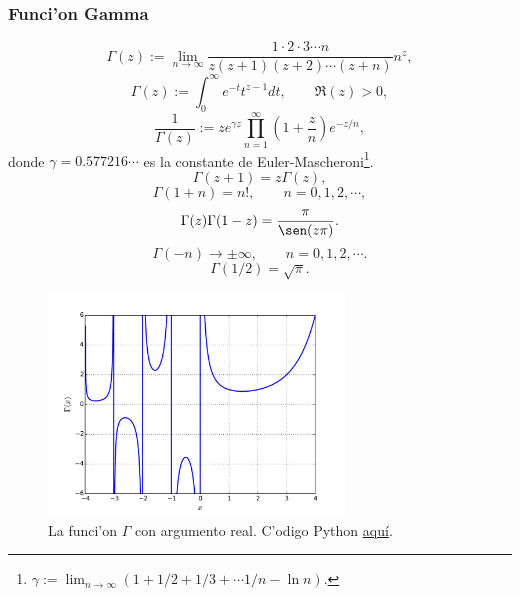 \subsubsection{Funci'on Gamma}
\begin{equation}
\Gamma(z):=\lim_{n\to\infty}\frac{1\cdot 2\cdot 3\cdots n}{z(z+1)(z+2)\cdots (z+n)}n^z,
\end{equation}
\begin{equation}
\Gamma(z):=\int_0^\infty e^{-t}t^{z-1}dt, \qquad \Re(z)>0,
\end{equation}
\begin{equation}
\frac{1}{\Gamma(z)}:=ze^{\gamma z}\prod_{n=1}^\infty \left(1+\frac{z}{n}\right)e^{-z/n},
\end{equation}
donde $\gamma=0.577216\cdots$ es la constante de Euler-Mascheroni\footnote{$\gamma:=\lim_{n\to\infty}\left(1+{1}/{2}+{1}/{3}+\cdots {1}/{n}-\ln n\right)$.}.
\begin{equation}
\Gamma(z+1)=z\Gamma(z),
\end{equation}
\begin{equation}
\Gamma(1+n)=n!, \qquad n=0,1,2,\cdots ,
\end{equation}
\begin{equation}\label{GzG1-z}
\Gamma(z)\Gamma(1-z)=\frac{\pi}{\sen(z\pi)}.
\end{equation}
\begin{equation}
\Gamma(-n)\to\pm\infty, \qquad n=0,1,2,\cdots .
\end{equation}
\begin{equation}
\Gamma(1/2)=\sqrt{\pi}.
\end{equation}
\begin{figure}[H]
\centering
\includegraphics[angle=0,width=0.7\textwidth]{figs/fig-funcion-Gamma.pdf}
\caption{La funci'on $\Gamma$ con argumento real. C'odigo Python \href{https://github.com/gfrubi/FM2/blob/master/figuras-editables/fig-Gamma.py}{aqu\'i}.}
\label{fig-Gamma}
\end{figure}


